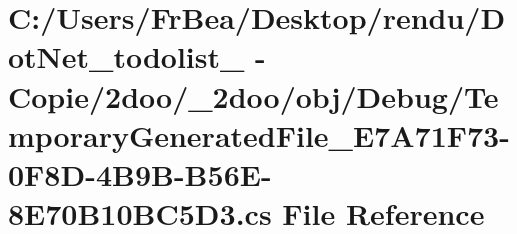 \hypertarget{obj_2_debug_2_temporary_generated_file___e7_a71_f73-0_f8_d-4_b9_b-_b56_e-8_e70_b10_b_c5_d3_8cs}{
\section{C:/Users/FrBea/Desktop/rendu/DotNet\_\-todolist\_ - Copie/2doo/\_\-2doo/obj/Debug/TemporaryGeneratedFile\_\-E7A71F73-0F8D-4B9B-B56E-8E70B10BC5D3.cs File Reference}
\label{obj_2_debug_2_temporary_generated_file___e7_a71_f73-0_f8_d-4_b9_b-_b56_e-8_e70_b10_b_c5_d3_8cs}
}
